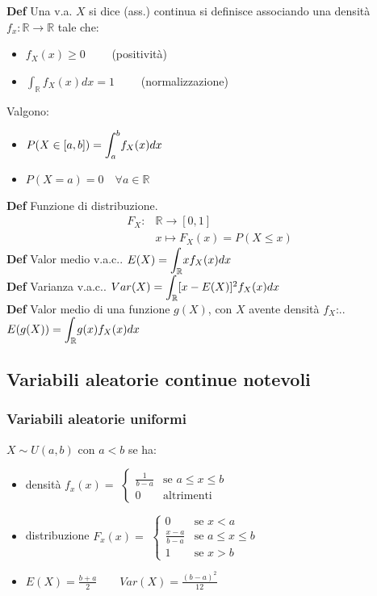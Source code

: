 \documentclass[10pt,a4paper]{article}
\begin{document}
\begin{multicols}{2}
\textbf{Def}
    Una v.a. $X$ si dice (ass.) continua si definisce associando una densit\`a $f_x : \mathbb{R}\to\mathbb{R}$ tale che:
\begin{itemize}
    \item $f_X(x) \geq 0 \qquad$ (positività)
    \item $\int_\mathbb{R} f_X(x) dx = 1 \qquad$ (normalizzazione)
\end{itemize}
Valgono:
\begin{itemize}
    \item $P(X \in [a,b]) = \mathlarger{\int_{a}^{b}} f_X(x)dx$
    \item $P(X = a) = 0\quad\forall a\in\mathbb{R}$
\end{itemize}
\textbf{Def} Funzione di distribuzione. \\
\[
    \begin{align*}
        F_X:    &\mathbb{R} \to [0, 1] \\
                &x \mapsto F_X(x) = P(X \leq x)
    \end{align*}
\]
\textbf{Def} Valor medio v.a.c.. \textit{
    $E(X) = \mathlarger{\int_\mathbb{R}} x f_X(x)dx$
}\\
\textbf{Def} Varianza v.a.c.. \textit{
    $Var(X) = \mathlarger{\int_\mathbb{R}} [x - E(X)]^2 f_X(x)dx$
}\\
\textbf{Def} Valor medio di una funzione $g(X)$, con $X$ avente densità $f_X$:.. \textit{
    $E(g(X)) = \mathlarger{\int_\mathbb{R}} g(x) f_X(x)dx$
}\\








\subsection*{Variabili aleatorie continue notevoli}
\subsubsection*{Variabili aleatorie uniformi}
$X\sim U(a,b)$ con $a<b$ se ha:
\begin{itemize}
    \item densità $f_x(x) =$
        $ \begin{cases}
            \frac{1}{b-a} &\mbox{se } a\leq x\leq b \\
            0 &\mbox{altrimenti}
        \end{cases} $
    \item distribuzione $F_x(x) =$
        $ \begin{cases}
            0 &\mbox{se } x<a\\
            \frac{x-a}{b-a} &\mbox{se } a\leq x\leq b \\
            1 &\mbox{se } x>b
        \end{cases} $
    \item $E(X)=\frac{b+a}{2} \qquad Var(X)=\frac{(b-a)^2}{12}$
\end{itemize}
    

\end{multicols}
\end{document}
